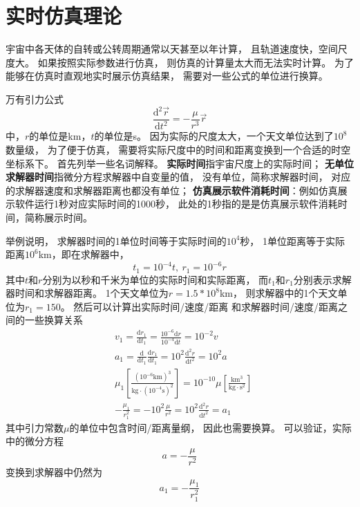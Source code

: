 \section{实时仿真理论}
宇宙中各天体的自转或公转周期通常以天甚至以年计算，
且轨道速度快，空间尺度大。
如果按照实际参数进行仿真，
则仿真的计算量太大而无法实时计算。
为了能够在仿真时直观地实时展示仿真结果，
需要对一些公式的单位进行换算。

万有引力公式
\begin{equation}
    \frac{\text{d}^2\vec{r}}{\text{d}t^2}=-\frac{\mu}{r^3}\vec{r} \label{eqRealGravity}
\end{equation}
中，$r$的单位是km，$t$的单位是s。
因为实际的尺度太大，一个天文单位达到了$10^8$数量级，
为了便于仿真，
需要将实际尺度中的时间和距离变换到一个合适的时空坐标系下。
首先列举一些名词解释。
\textbf{实际时间}指宇宙尺度上的实际时间；
\textbf{无单位求解器时间}指微分方程求解器中自变量的值，
没有单位，简称求解器时间，
对应的求解器速度和求解器距离也都没有单位；
\textbf{仿真展示软件消耗时间}：例如仿真展示软件运行1秒对应实际时间的1000秒，
此处的1秒指的是是仿真展示软件消耗时间，简称展示时间。

举例说明，
求解器时间的1单位时间等于实际时间的$10^4$秒，
1单位距离等于实际距离$10^6$km，即在求解器中，
\begin{equation}
    t_1=10^{-4}t,\ r_1=10^{-6}r \label{eqRealConvert}
\end{equation}
其中$t$和$r$分别为以秒和千米为单位的实际时间和实际距离，
而$t_1$和$r_1$分别表示求解器时间和求解器距离。
1个天文单位为$r=1.5*10^8$km，
则求解器中的1个天文单位为$r_1=150$。
然后可以计算出实际时间/速度/距离
和求解器时间/速度/距离之间的一些换算关系
\begin{align*}
&v_1 = \frac{\text{d}r_1}{\text{d}t_1}
 = \frac{10^{-6}\text{d}r}{10^{-4}\text{d}t} = 10^{-2}v \\
&a_1 = \frac{\text{d}}{\text{d}t_1}\frac{\text{d}r_1}{\text{d}t_1}
 = 10^2\frac{\text{d}^2r}{\text{d}t^2} = 10^2a \\
&\mu_1\left[\frac{(10^{-6}\text{km})^3}{\text{kg}\cdot(10^{-4}\text{s})^2}\right]
 = 10^{-10}\mu\left[\frac{\text{km}^3}{\text{kg}\cdot \text{s}^2}\right] \\
&-\frac{\mu_1}{r_1^2} = -10^2\frac{\mu}{r^2}
 = 10^2\frac{\text{d}^2r}{\text{d}t^2} = a_1
\end{align*}
其中引力常数$\mu$的单位中包含时间/距离量纲，
因此也需要换算。
可以验证，实际中的微分方程
$$a=-\frac{\mu}{r^2}$$
变换到求解器中仍然为
$$a_1=-\frac{\mu_1}{r_1^2}$$

